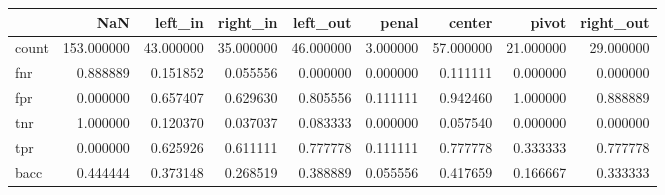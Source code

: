 \begin{tabular}{lrrrrrrrr}
\toprule
{} &         NaN &    left\_in &   right\_in &   left\_out &     penal &     center &      pivot &  right\_out \\
\midrule
count &  153.000000 &  43.000000 &  35.000000 &  46.000000 &  3.000000 &  57.000000 &  21.000000 &  29.000000 \\
fnr   &    0.888889 &   0.151852 &   0.055556 &   0.000000 &  0.000000 &   0.111111 &   0.000000 &   0.000000 \\
fpr   &    0.000000 &   0.657407 &   0.629630 &   0.805556 &  0.111111 &   0.942460 &   1.000000 &   0.888889 \\
tnr   &    1.000000 &   0.120370 &   0.037037 &   0.083333 &  0.000000 &   0.057540 &   0.000000 &   0.000000 \\
tpr   &    0.000000 &   0.625926 &   0.611111 &   0.777778 &  0.111111 &   0.777778 &   0.333333 &   0.777778 \\
bacc  &    0.444444 &   0.373148 &   0.268519 &   0.388889 &  0.055556 &   0.417659 &   0.166667 &   0.333333 \\
\bottomrule
\end{tabular}

